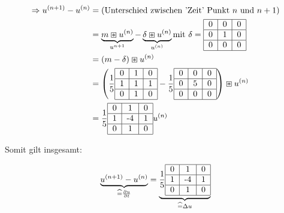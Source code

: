 \documentclass[ngerman]{article}
\theoremstyle{plain}
\theoremstyle{definition}
\numberwithin{equation}{section}
\begin{document}
    \begin{align*}
        \Rightarrow u^{(n+1)} - u^{(n)} & = \text{(Unterschied zwischen 'Zeit' Punkt $n$ und $n+1$)}\\
        &= \underbrace{m \boxast u^{(n)}}_{u^{n+1}} - \underbrace{\delta \boxast u^{(n)}}_{u^{(n)}} \text{mit } \delta = \begin{tabular}{|c|c|c|}
            \hline
            0 & 0 & 0\\
            \hline
            0 & 1 & 0\\
            \hline
            0 & 0 & 0\\
            \hline
        \end{tabular}\\
        &=(m - \delta) \boxast u^{(n)}\\
        &=\left( \frac{1}{5}\begin{tabular}{|c|c|c|}
            \hline
            0 & 1 & 0\\
            \hline
            1 & 1 & 1\\
            \hline
            0 & 1 & 0\\
            \hline
        \end{tabular} - \frac{1}{5} \begin{tabular}{|c|c|c|}
            \hline
            0 & 0 & 0\\
            \hline
            0 & 5 & 0\\
            \hline
            0 & 0 & 0\\
            \hline
        \end{tabular}\right) \boxast u^{(n)}\\
        &= \frac{1}{5} \begin{tabular}{|c|c|c|}
            \hline
            0 & 1 & 0\\
            \hline
            1 & -4 & 1\\
            \hline
            0 & 1 & 0\\
            \hline
        \end{tabular} u^{(n)}
    \end{align*}

    Somit gilt insgesamt:

    \begin{equation}\label{eq:5.11}
        \underbrace{u^{(n+1)} - u^{(n)}}_{\widehat = \frac{\partial u}{\partial t}} = \underbrace{\frac{1}{5} \begin{tabular}{|c|c|c|}
            \hline
            0 & 1 & 0\\
            \hline
            1 & -4 & 1\\
            \hline
            0 & 1 & 0\\
            \hline
        \end{tabular}}_{\widehat = \Delta u}
    \end{equation}
\end{document}

